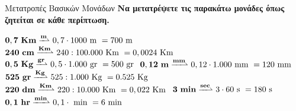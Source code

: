 \begin{prdgm}[halign=flush left,label=prdgm:metatropesmonadon]{Μετατροπές Βασικών Μονάδων}
\textbf{Να μετατρέψετε τις παρακάτω μονάδες όπως ζητείται σε κάθε περίπτωση.}
\tcblower


$\vspace{4mm}\mathbf{
0,7 \text{ }Km \xrightharpoonup{m}} \text{ }0,7 \cdot 1000 \monm = 700 \monm\\
$
\vspace{4mm}
$\mathbf{
240 \text{ }cm \xrightharpoonup{Km}} \text{ }240 : 100.000 \text{ Km } = 0,0024 \text{ Km }\\
$
\vspace{4mm}
$\mathbf{
0,5 \text{ }Kg \xrightharpoonup{gr}} \text{ }0,5 \cdot 1.000 \text{ gr }= 500 \text{ gr }\\
$
\vspace{4mm}
$\mathbf{
0,12\text{ } m \xrightharpoonup{mm}} \text{ }0,12 \cdot 1.000 \text{ mm } = 120 \text{ mm }\\
$
\vspace{4mm}
$\mathbf{
525 \text{ }gr \xrightharpoonup{Kg}} \text{ }525: 1.000 \monkg= 0.525 \monkg\\
$
\vspace{4mm}
$\mathbf{
220 \text{ }dm \xrightharpoonup{Km}}\text{ } 220:10.000 \text{ Km } = 0,022 \text{ Km }\\
$
\vspace{4mm}
$\mathbf{
3 \text{ }min \xrightharpoonup{sec}} \text{ } 3 \cdot 60 \mons = 180 \mons\\
$
\vspace{4mm}
$\mathbf{
0,1\text{ } hr \xrightharpoonup{min}} \text{ } 0,1 \cdot \text{ min }= 6 \text{ min }\\
$


\end{prdgm}

